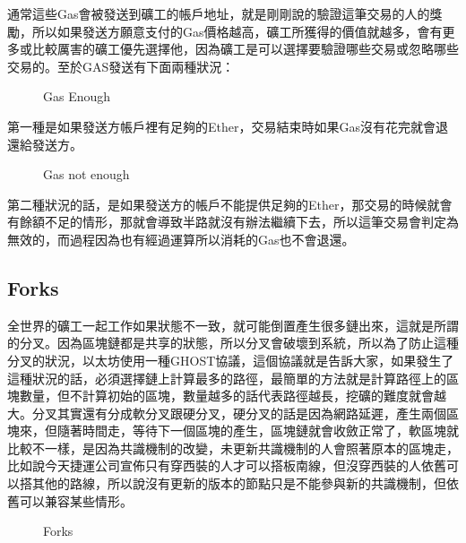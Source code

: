 通常這些Gas會被發送到礦工的帳戶地址，就是剛剛說的驗證這筆交易的人的獎勵，所以如果發送方願意支付的Gas價格越高，礦工所獲得的價值就越多，會有更多或比較厲害的礦工優先選擇他，因為礦工是可以選擇要驗證哪些交易或忽略哪些交易的。至於GAS發送有下面兩種狀況：\\
\begin{figure}[H]
    \caption{Gas Enough}
    \label{fig:Gasenough}
\end{figure}
第一種是如果發送方帳戶裡有足夠的Ether，交易結束時如果Gas沒有花完就會退還給發送方。\\
\begin{figure}[H]
    \caption{Gas not enough}
    \label{fig:Gasnotenough}
\end{figure}
第二種狀況的話，是如果發送方的帳戶不能提供足夠的Ether，那交易的時候就會有餘額不足的情形，那就會導致半路就沒有辦法繼續下去，所以這筆交易會判定為無效的，而過程因為也有經過運算所以消耗的Gas也不會退還。
\subsection{Forks}
全世界的礦工一起工作如果狀態不一致，就可能倒置產生很多鏈出來，這就是所謂的分叉。因為區塊鏈都是共享的狀態，所以分叉會破壞到系統，所以為了防止這種分叉的狀況，以太坊使用一種GHOST協議，這個協議就是告訴大家，如果發生了這種狀況的話，必須選擇鏈上計算最多的路徑，最簡單的方法就是計算路徑上的區塊數量，但不計算初始的區塊，數量越多的話代表路徑越長，挖礦的難度就會越大。分叉其實還有分成軟分叉跟硬分叉，硬分叉的話是因為網路延遲，產生兩個區塊來，但隨著時間走，等待下一個區塊的產生，區塊鏈就會收斂正常了，軟區塊就比較不一樣，是因為共識機制的改變，未更新共識機制的人會照著原本的區塊走，比如說今天捷運公司宣佈只有穿西裝的人才可以搭板南線，但沒穿西裝的人依舊可以搭其他的路線，所以說沒有更新的版本的節點只是不能參與新的共識機制，但依舊可以兼容某些情形。
\vspace{0.5cm}
\begin{figure}[h]
    \caption{Forks}
    \label{fig:Forks}
\end{figure}
